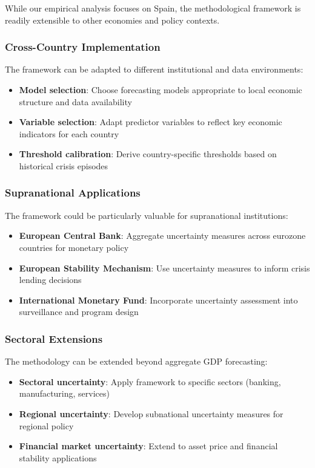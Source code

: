 \documentclass[5p,authoryear]{elsarticle}
\begin{document}
While our empirical analysis focuses on Spain, the methodological framework is readily extensible to other economies and policy contexts.

\subsubsection{Cross-Country Implementation}
The framework can be adapted to different institutional and data environments:

\begin{itemize}
    \item \textbf{Model selection}: Choose forecasting models appropriate to local economic structure and data availability
    \item \textbf{Variable selection}: Adapt predictor variables to reflect key economic indicators for each country
    \item \textbf{Threshold calibration}: Derive country-specific thresholds based on historical crisis episodes
\end{itemize}

\subsubsection{Supranational Applications}
The framework could be particularly valuable for supranational institutions:

\begin{itemize}
    \item \textbf{European Central Bank}: Aggregate uncertainty measures across eurozone countries for monetary policy
    \item \textbf{European Stability Mechanism}: Use uncertainty measures to inform crisis lending decisions
    \item \textbf{International Monetary Fund}: Incorporate uncertainty assessment into surveillance and program design
\end{itemize}

\subsubsection{Sectoral Extensions}
The methodology can be extended beyond aggregate GDP forecasting:

\begin{itemize}
    \item \textbf{Sectoral uncertainty}: Apply framework to specific sectors (banking, manufacturing, services)
    \item \textbf{Regional uncertainty}: Develop subnational uncertainty measures for regional policy
    \item \textbf{Financial market uncertainty}: Extend to asset price and financial stability applications
\end{itemize}
\end{document}
